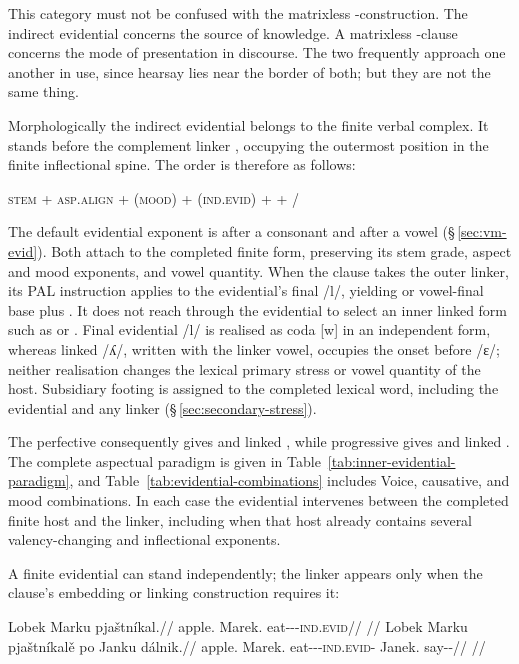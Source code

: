 This category must not be confused with the matrixless -construction.
The indirect evidential concerns the source of knowledge. A matrixless
-clause concerns the mode of presentation in discourse. The two
frequently approach one another in use, since hearsay lies near the border of
both; but they are not the same thing.

Morphologically the indirect evidential belongs to the finite verbal complex. It
stands before the complement linker , occupying the outermost position
in the finite inflectional spine. The order is therefore as follows:

\begin{center}
\textsc{stem} + \textsc{asp.align} + (\textsc{mood}) + (\textsc{ind.evid}) +
 + /
\end{center}

The default evidential exponent is  after a consonant and
 after a vowel (§\,\ref{sec:vm-evid}). Both attach to the completed
finite form, preserving its stem grade, aspect and mood exponents, and vowel
quantity. When the clause takes the outer linker, its PAL instruction applies
to the evidential's final /l/, yielding  or vowel-final base plus
. It does not reach through the evidential to select an inner linked
form such as  or . Final evidential /l/
is realised as coda [w] in an independent form, whereas linked /ʎ/,
written  with the linker vowel, occupies the onset before /ɛ/; neither realisation changes the lexical
primary stress or vowel quantity of the host. Subsidiary footing is assigned
to the completed lexical word, including the evidential and any linker
(§\,\ref{sec:secondary-stress}).

The perfective  consequently gives  and
linked , while progressive  gives
 and linked . The complete aspectual
paradigm is given in Table~\ref{tab:inner-evidential-paradigm}, and
Table~\ref{tab:evidential-combinations} includes Voice, causative, and mood
combinations. In each case the evidential intervenes between the completed
finite host and the linker, including when that host already contains several
valency-changing and inflectional exponents.

A finite evidential can stand independently; the linker appears only when the
clause's embedding or linking construction requires it:

\pex
\a
\begingl
\gla Lobek Marku pjaštníkal.//
\glb apple.\Dir{} Marek.\Trs{} eat-\Trs{}-\Pf{}-\textsc{ind.evid}//
\glft {}//
\endgl
\a
\begingl
\gla Lobek Marku pjaštníkalě po Janku dálnik.//
\glb apple.\Dir{} Marek.\Trs{} eat-\Trs{}-\Pf{}-\textsc{ind.evid}-\Lnk{} \Compl{} Janek.\Trs{} say-\Trs{}-\Pf{}//
\glft {}//
\endgl
\xe

